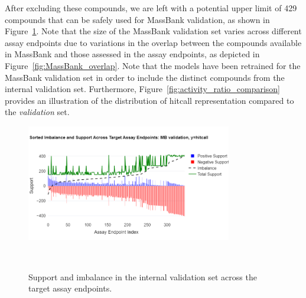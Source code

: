 \begin{enumerate}
    After excluding these compounds, we are left with a potential upper limit of 429 compounds that can be safely used for MassBank validation, as shown in Figure~\ref{fig:imbalance_hitcall_mb_val}. Note that the size of the MassBank validation set varies across different assay endpoints due to variations in the overlap between the compounds available in MassBank and those assessed in the assay endpoints, as depicted in Figure~\ref{fig:MassBank_overlap}. Note that the models have been retrained for the MassBank validation set in order to include the distinct compounds from the internal validation set. Furthermore, Figure~\ref{fig:activity_ratio_comparison} provides an illustration of the distribution of hitcall representation compared to the \emph{validation} set.

    \begin{figure}[h]
        \centering
        \includegraphics[width=0.8\textwidth]{figures/imbalance_hitcall_mb_val.png}
        \caption{Support and imbalance in the internal validation set across the target assay endpoints.}
    ~\label{fig:imbalance_hitcall_mb_val}
    \end{figure}



\end{enumerate}
